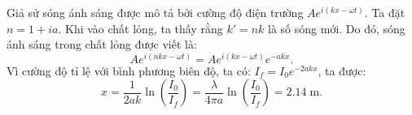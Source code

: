 \begin{solution}
	Giả sử sóng ánh sáng được mô tả bởi cường độ điện trường $Ae^{i(kx - \omega t)}$. Ta đặt $n = 1 + ia$. Khi vào chất lỏng, ta thấy rằng $k' = nk$ là số sóng mới. Do đó, sóng ánh sáng trong chất lỏng được viết là:
$$Ae^{i(nkx - \omega t)} = Ae^{i(kx- \omega t)}e^{-akx}.$$
Vì cường độ tỉ lệ với bình phương biên độ, ta có:
$I_f = I_0 e^{-2akx}$, ta được:
$$x = \frac{1}{2ak}\ln\left(\frac{I_0}{I_f}\right) = \frac{\lambda}{4\pi a}\ln\left(\frac{I_0}{I_f}\right) = \boxed{2.14\;\text{m}}.$$
\end{solution}
